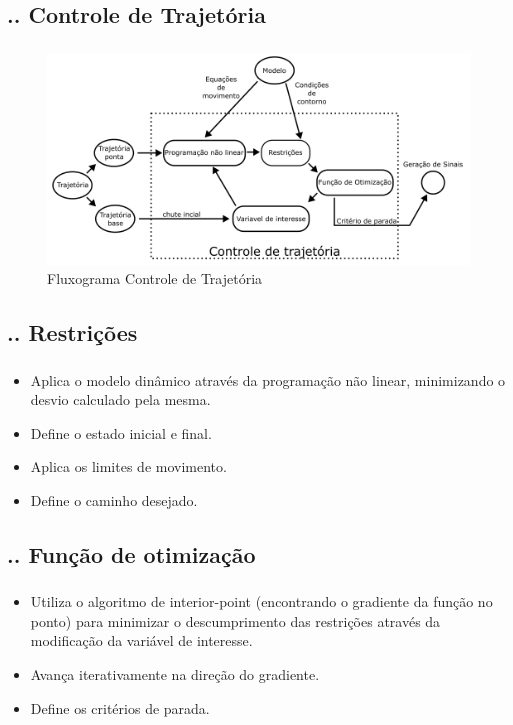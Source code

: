 \documentclass[aspectratio=169]{beamer}
\begin{document}
\subsection{\insertsectionnumber .\insertsubsectionnumber . Controle de Trajetória}
\begin{frame}
  \frametitle{\insertsubsection}
  \begin{figure}[H]
    \centering
    \caption{Fluxograma Controle de Trajetória}
    \includegraphics[scale=0.5]{controle_de_trajetoria}

    \label{fig:controle_de_trajetoria}
  \end{figure}
\end{frame}

\subsection{\insertsectionnumber .\insertsubsectionnumber . Restrições}
\begin{frame}
  \frametitle{\insertsubsection}
  \begin{itemize}
    \item Aplica o modelo dinâmico através da programação não linear, minimizando o desvio calculado pela mesma.
    \item Define o estado inicial e final.
    \item Aplica os limites de movimento.
    \item Define o caminho desejado.
  \end{itemize}
\end{frame}

\subsection{\insertsectionnumber .\insertsubsectionnumber . Função de otimização}
\begin{frame}
  \frametitle{\insertsubsection}
  \begin{itemize}
    \item Utiliza o algoritmo de interior-point (encontrando o gradiente da função no ponto) para minimizar o descumprimento das restrições através da modificação da variável de interesse.
    \item Avança iterativamente na direção do gradiente.
    \item Define os critérios de parada.
  \end{itemize}
\end{frame}
\end{document}
